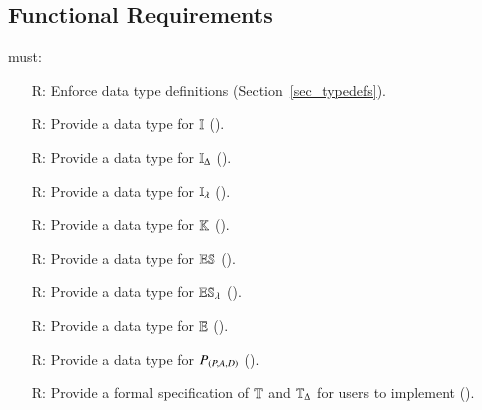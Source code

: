 \subsection{Functional Requirements}\label{sec_functionalreqs}

\progname{} must:
\noindent \begin{itemize}

    \item[R\refstepcounter{reqnum}\thereqnum \label{R_Types}:] Enforce data
    type definitions (Section~\ref{sec_typedefs}).

    \item[R\refstepcounter{reqnum}\thereqnum \label{R_IntensityTypeUse}:]
    Provide a data type for $\mathbb{I}$
    ().

    \item[R\refstepcounter{reqnum}\thereqnum \label{R_IntensityChangeType}:]
    Provide a data type for $\mathbb{I}_{\Delta}$ ().

    \item[R\refstepcounter{reqnum}\thereqnum \label{R_IntensityDecayType}:]
    Provide a data type for $\mathbb{I_{\lambda}}$ ().

    \item[R\refstepcounter{reqnum}\thereqnum \label{R_EmotionKindsType}:]
    Provide a data type for $\mathbb{K}$ ().

    \item[R\refstepcounter{reqnum}\thereqnum \label{R_EmotionStateType}:]
    Provide a data type for $\mathbb{ES}$ ().

    \item[R\refstepcounter{reqnum}\thereqnum \label{R_EmotionDecayStateType}:]
    Provide a data type for $\mathbb{ES}_\lambda$
    ().

    \item[R\refstepcounter{reqnum}\thereqnum \label{R_EmotionType}:] Provide a
    data type for $\mathbb{E}$ ().

    \item[R\refstepcounter{reqnum}\thereqnum \label{R_PADPointType}:] Provide
    a data type for $P_{\left(P,A,D\right)}$ ().

    \item[R\refstepcounter{reqnum}\thereqnum \label{R_TimeType}:] Provide a
    formal specification of $\mathbb{T}$ and $\mathbb{T}_{\Delta}$ for users to
    implement ().


\end{itemize}
